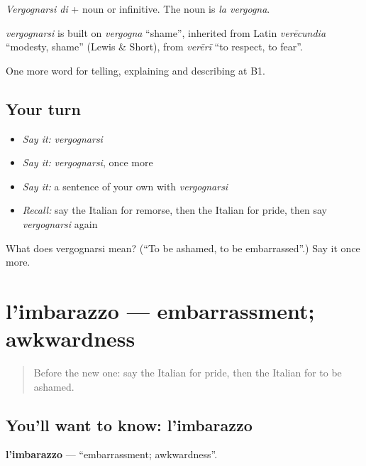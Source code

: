 \emph{Vergognarsi di} + noun or infinitive. The noun is \emph{la vergogna}.

\begin{cousinweb}
\emph{vergognarsi} is built on \emph{vergogna} \textquotedblleft{}shame\textquotedblright{}, inherited from Latin \emph{verēcundia} \textquotedblleft{}modesty, shame\textquotedblright{} (Lewis \& Short), from \emph{verērī} \textquotedblleft{}to respect, to fear\textquotedblright{}.
\end{cousinweb}

\begin{grammarlens}[title={What you've built}]
One more word for telling, explaining and describing at B1.
\end{grammarlens}

\subsection*{Your turn}
\begin{itemize}
\raggedright
  \item \emph{Say it:} \emph{vergognarsi}
  \item \emph{Say it:} \emph{vergognarsi}, once more
  \item \emph{Say it:} a sentence of your own with \emph{vergognarsi}
  \item \emph{Recall:} say the Italian for remorse, then the Italian for pride, then say \emph{vergognarsi} again
\end{itemize}

\begin{tcolorbox}[breakable,colback=teal!4,colframe=teal!35!black,title={Before you move on}]
What does vergognarsi mean? (\textquotedblleft{}To be ashamed, to be embarrassed\textquotedblright{}.) Say it once more.
\end{tcolorbox}
\section[l'imbarazzo]{l'imbarazzo — embarrassment; awkwardness}

\label{lesson:IT-C478-imbarazzo}



\begin{quote}
Before the new one: say the Italian for pride, then the Italian for to be ashamed.
\end{quote}

\subsection*{You'll want to know: l'imbarazzo}
\textbf{l'imbarazzo} — \textquotedblleft{}embarrassment; awkwardness\textquotedblright{}.

